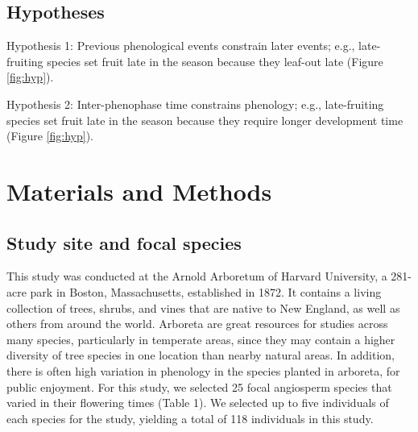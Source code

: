 \documentclass{article}
\begin{document}
\subsection* {Hypotheses}
\par Hypothesis 1: Previous phenological events constrain later events; e.g., late-fruiting species set fruit late in the season because they leaf-out late  (Figure \ref{fig:hyp}).
\par Hypothesis 2: Inter-phenophase time  constrains phenology; e.g., late-fruiting species set fruit late in the season because they require longer development time (Figure \ref{fig:hyp}).
\section* {Materials and Methods}
\subsection*{Study site and focal species}
This study was conducted at the Arnold Arboretum of Harvard University, a 281-acre park in Boston, Massachusetts, established in 1872. It contains a living collection of trees, shrubs, and vines that are native to New England, as well as others from around the world. Arboreta are great resources for studies across many species, particularly in temperate areas, since they may contain a higher diversity of tree species in one location than nearby natural areas. In addition, there is often high variation in phenology in the species planted in arboreta, for public enjoyment. For this study, we selected 25 focal angiosperm species that varied in their flowering times (Table 1). We selected up to five individuals of each species for the study, yielding a total of 118 individuals in this study.
\end{document}
